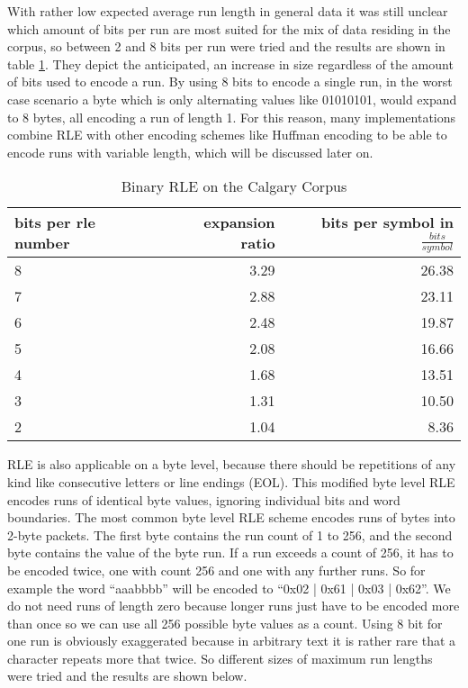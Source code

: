 \par{
	With rather low expected average run length in general data it was still unclear which amount of bits per run are most suited for the mix of data residing in the corpus, so between 2 and 8 bits per run were tried and the results are shown in table \ref{tab:t4 simple run length eval}. They depict the anticipated, an increase in size regardless of the amount of bits used to encode a run. By using 8 bits to encode a single run, in the worst case scenario a byte which is only alternating values like 01010101, would expand to 8 bytes, all encoding a run of length 1. For this reason, many implementations combine RLE with other encoding schemes like Huffman encoding to be able to encode runs with variable length, which will be discussed later on.
}

\begin{table}[h]
	\centering
	\begin{tabular}{l|r|r}
		\label{tab:t4 simple run length eval}
		
		bits per rle number &  expansion ratio & bits per symbol in $\frac{bits}{symbol}$\\
		\hline
		8 & 3.29& 26.38\\
		7 & 2.88& 23.11\\
		6 & 2.48& 19.87\\
		5 & 2.08& 16.66\\
		4 & 1.68 & 13.51\\
		3 & 1.31& 10.50\\
		2 & 1.04& 8.36\\
	\end{tabular}
	\caption{Binary RLE on the Calgary Corpus}
\end{table}

\par{
RLE is also applicable on a byte level, because there should be repetitions of any kind like consecutive letters or line endings (EOL). This modified byte level RLE encodes runs of identical byte values, ignoring individual bits and word boundaries. The most common byte level RLE scheme encodes runs of bytes into 2-byte packets. The first byte contains the run count of 1 to 256, and the second byte contains the value of the byte run. If a run exceeds a count of 256, it has to be encoded twice, one with count 256 and one with any further runs. So for example the word \enquote{aaabbbb} will be encoded to \enquote{0x02 | 0x61 | 0x03 | 0x62}. We do not need runs of length zero because longer runs just have to be encoded more than once so we can use all 256 possible byte values as a count. Using 8 bit for one run is obviously exaggerated because in arbitrary text it is rather rare that a character repeats more that twice. So different sizes of maximum run lengths were tried and the results are shown below.
}

